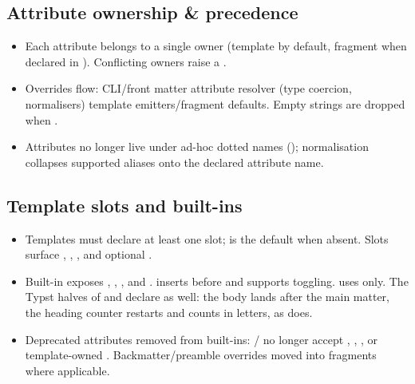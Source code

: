 \documentclass[a4paper,twoside]{article}
\begin{document}
\subsection{Attribute ownership \& precedence}
\begin{itemize}
\item Each attribute belongs to a single owner (template by default, fragment when declared in ). Conflicting owners raise a .
\item Overrides flow: CLI/front matter attribute resolver (type coercion, normalisers) template emitters/fragment defaults. Empty strings are dropped when .
\item Attributes no longer live under ad-hoc dotted names (); normalisation collapses supported aliases onto the declared attribute name.
\end{itemize}
\subsection{Template slots and built-ins}
\begin{itemize}
\item Templates must declare at least one slot;  is the default when absent. Slots surface , , , and optional .
\item Built-in  exposes , , , and .  inserts  before  and supports  toggling.  uses  only. The Typst halves of  and  declare  as well: the body lands after the main matter, the heading counter restarts and counts in letters, as  does.
\item Deprecated attributes removed from built-ins: / no longer accept , , , or template-owned . Backmatter/preamble overrides moved into fragments where applicable.
\end{itemize}
\end{document}
